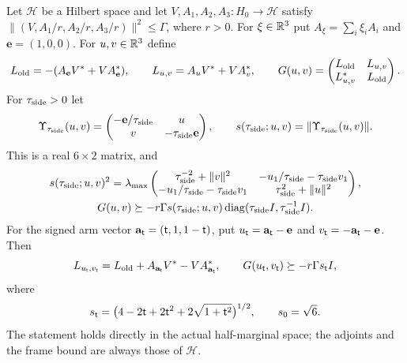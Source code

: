 \begin{lemma}\label{lem:record:direct-gram}
Let $\mathcal H$ be a Hilbert space and let $V,A_1,A_2,A_3\colon H_0\to\mathcal H$
satisfy $\|(V,A_1/r,A_2/r,A_3/r)\|^2\le\Gamma$, where $r>0$.
For $\xi\in\mathbb R^3$ put $A_\xi=\sum_i\xi_iA_i$ and $\mathbf e=(1,0,0)$.
For $u,v\in\mathbb R^3$ define
\[
 L_{\rm old}=-(A_{\mathbf e}V^*+VA_{\mathbf e}^*),\qquad
 L_{u,v}=A_uV^*+VA_v^*,\qquad
 G(u,v)=\begin{pmatrix}L_{\rm old}&L_{u,v}\\L_{u,v}^*&L_{\rm old}\end{pmatrix}.
\]
For $\tau_{\mathrm{side}}>0$ let
\[
 \Upsilon_{\tau_{\mathrm{side}}}(u,v)=
 \begin{pmatrix}-\mathbf e/\tau_{\mathrm{side}}&u\\v&-\tau_{\mathrm{side}}\mathbf e\end{pmatrix},\qquad
 s(\tau_{\mathrm{side}};u,v)=\|\Upsilon_{\tau_{\mathrm{side}}}(u,v)\|.
\]
This is a real $6\times2$ matrix, and
\begin{gather*}
 s(\tau_{\mathrm{side}};u,v)^2=\lambda_{\max}
 \begin{pmatrix}\tau_{\mathrm{side}}^{-2}+\|v\|^2&-u_1/\tau_{\mathrm{side}}-\tau_{\mathrm{side}} v_1\\
 -u_1/\tau_{\mathrm{side}}-\tau_{\mathrm{side}} v_1&\tau_{\mathrm{side}}^2+\|u\|^2\end{pmatrix},\\
 G(u,v)\succeq-r\Gamma s(\tau_{\mathrm{side}};u,v)
 \operatorname{diag}(\tau_{\mathrm{side}} I,\tau_{\mathrm{side}}^{-1}I).
\end{gather*}
For the signed arm vector $\mathbf a_\mathsf t=(\mathsf t,1,1-\mathsf t)$, put
$u_\mathsf t=\mathbf a_\mathsf t-\mathbf e$ and
$v_\mathsf t=-\mathbf a_\mathsf t-\mathbf e$. Then
\[
 L_{u_\mathsf t,v_\mathsf t}=L_{\rm old}
 +A_{\mathbf a_\mathsf t}V^*-VA_{\mathbf a_\mathsf t}^*,\qquad
 G(u_\mathsf t,v_\mathsf t)\succeq-r\Gamma s_\mathsf t I,
\]
where
\[
 s_\mathsf t=\bigl(4-2\mathsf t+2\mathsf t^2+2\sqrt{1+\mathsf t^2}\bigr)^{1/2},
 \qquad s_0=\sqrt6.
\]
The statement holds directly in the actual half-marginal space; the adjoints
and the frame bound are always those of $\mathcal H$.
\end{lemma}

